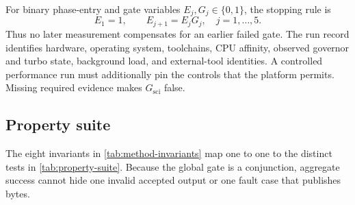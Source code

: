 For binary phase-entry and gate variables $E_j,G_j\in\{0,1\}$, the stopping
rule is
\begin{equation}
 E_1=1,\qquad E_{j+1}=E_jG_j,\quad j=1,\ldots,5.
 \label{eq:evaluation-stopping}
\end{equation}
Thus no later measurement compensates for an earlier failed gate. The run
record identifies hardware, operating system, toolchains, CPU affinity,
observed governor and turbo state, background load, and external-tool
identities. A controlled performance run must additionally pin the controls
that the platform permits. Missing required evidence makes
\(G_{\mathrm{sci}}\) false.

\subsection{Property suite}
\label{subsec:property-suite}

The eight invariants in \cref{tab:method-invariants} map one to one to the
distinct tests in \cref{tab:property-suite}. Because the global gate is a
conjunction, aggregate success cannot hide one invalid accepted output or one
fault case that publishes bytes.

